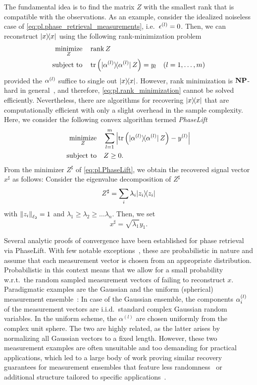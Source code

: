 The fundamental idea is to find the matrix $Z$ with the smallest rank that is compatible with the observations.
As an example, consider the idealized noiseless case of \cref{eq:pl.phase_retrieval_measurements}, i.e.\ $\epsilon^{(l)} = 0$.
Then, we can reconstruct $\ketbra{x}$ using the following rank-minimization problem
\[
  \begin{split}
    \underset{{Z}}{\textrm{minimize}} &\quad \rank Z \\
    \textrm{subject to} &\quad  \tr\left( \ketbra{\alpha\ind{l}} \, Z \right) = y_l \quad (l=1,\ldots,m)
  \end{split}
  \label{eq:pl.rank_minimization}
\]
provided the $\alpha^{(l)}$ suffice to single out $\ketbra{x}$.
However, rank minimization is $\mathbf{NP}$-hard in general~\cite{Boyd_2004_Convex}, and therefore, \cref{eq:pl.rank_minimization} cannot be solved efficiently.
Nevertheless, there are algorithms for recovering $\ketbra{x}$ that are computationally efficient with only a slight overhead in the sample complexity.
Here, we consider the following convex algorithm termed \emph{PhaseLift}~\cite{Candes_2013_Phaselift}
\[
  \label{eq:pl.PhaseLift}
  \begin{split}
    \underset{{Z}}{\textrm{minimize}} & \quad \sum_{l=1}^m \left| \tr \left( \ket{\alpha^{(l)}} \bra{\alpha^{(l)}} \, {Z} \right) - y^{(l)} \right| \\
    \textrm{subject to} &\quad  {Z} \geq 0. \nonumber
  \end{split}
\]
From the minimizer $Z^\sharp$ of \cref{eq:pl.PhaseLift}, we obtain the recovered signal vector ${ x}^\sharp$ as follows:
Consider the eigenvalue decomposition of $Z^\sharp$
\[
  Z^\sharp = \sum_i \lambda_i \ketbra{z_i}
\]
with ${\Vert z_i\Vert}_{\ell_2} = 1$ and $\lambda_1 \ge \lambda_2 \ge \ldots \lambda_n$.
Then, we set
\[
  x^\sharp = \sqrt{\lambda_1} y_1.
  \label{eq:pl.vector_from_matrix}
\]

Several analytic proofs of convergence have been established for phase retrieval via PhaseLift.
With few notable exceptions~\cite{Kech_2016_Explicit}, these are probabilistic in nature and assume that each measurement vector is chosen from an appropriate distribution.
Probabilistic in this context means that we allow for a small probability w.r.t.\ the random sampled measurement vectors of failing to reconstruct $x$.
Paradigmatic examples are the Gaussian and the uniform (spherical) measurement ensemble~\cite{Candes_2013_Phaselift}:
In case of the Gaussian ensemble, the components $\alpha^{(l)}_i$ of the measurement vectors are i.i.d.\ standard complex Gaussian random variables.
In the uniform scheme, the $\alpha^{(l)}$ are chosen uniformly from the complex unit sphere.
The two are highly related, as the latter arises by normalizing all Gaussian vectors to a fixed length.
However, these two measurement examples are often unsuitable and too demanding for practical applications, which led to a large body of work proving similar recovery guarantees  for measurement ensembles that feature less randomness~\cite{Gross_2014_Partial,Kueng_2014_Low,Kueng_2014_Low,Kueng_2016_Low} or additional structure tailored to specific applications~\cite{Candes_2013_Phaselift,Gross_2017_Improved,Voroninski_2013_Quantum,Kueng_2015_Low}.


